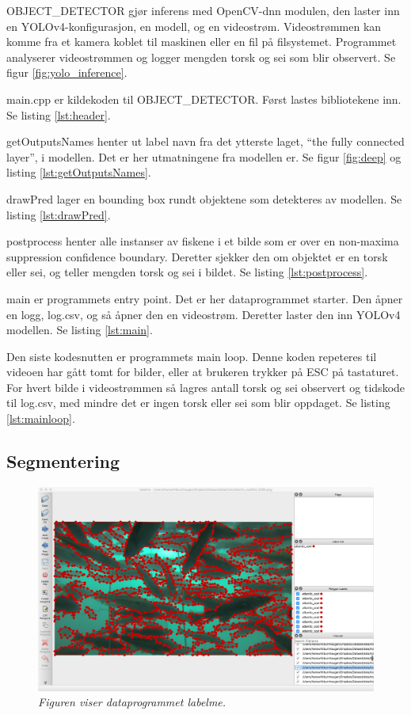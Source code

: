 OBJECT\_DETECTOR gjør inferens med OpenCV-dnn modulen, den laster inn en YOLOv4-konfigurasjon, en modell, og en videostrøm. Videostrømmen kan komme fra et kamera koblet til maskinen eller en fil på filsystemet. Programmet analyserer videostrømmen og logger mengden torsk og sei som blir observert. Se figur \ref{fig:yolo_inference}.

main.cpp er kildekoden til OBJECT\_DETECTOR. Først lastes bibliotekene inn. Se listing \ref{lst:header}.

getOutputsNames henter ut label navn fra det ytterste laget, ``the fully connected layer'', i modellen. Det er her utmatningene fra modellen er. Se figur \ref{fig:deep} og listing \ref{lst:getOutputsNames}.

drawPred lager en bounding box rundt objektene som detekteres av modellen. Se listing \ref{lst:drawPred}.

postprocess henter alle instanser av fiskene i et bilde som er over en non-maxima suppression confidence boundary. Deretter sjekker den om objektet er en torsk eller sei, og teller mengden torsk og sei i bildet. Se listing \ref{lst:postprocess}.

main er programmets entry point. Det er her dataprogrammet starter. Den åpner en logg, log.csv, og så åpner den en videostrøm. Deretter laster den inn YOLOv4 modellen. Se listing \ref{lst:main}.

Den siste kodesnutten er programmets main loop. Denne koden repeteres til videoen har gått tomt for bilder, eller at brukeren trykker på ESC på tastaturet. For hvert bilde i videostrømmen så lagres antall torsk og sei observert og tidskode til log.csv, med mindre det er ingen torsk eller sei som blir oppdaget. Se listing \ref{lst:mainloop}.


\subsection{Segmentering}

\begin{figure}[h!]
\begin{center} 
\includegraphics[scale=0.25]{figures/labelme}
\caption{\small \sl Figuren viser dataprogrammet labelme. \cite{Wada 2016} \label{fig:labelme}} 
\end{center} 
\end{figure} 
